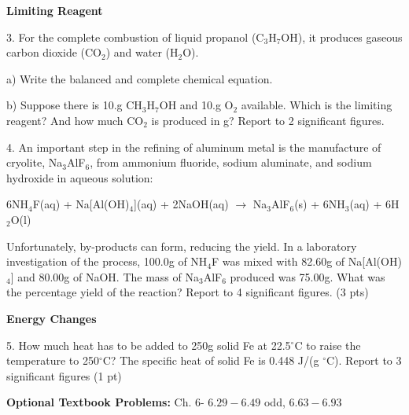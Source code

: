 \documentclass[12pt]{article}
\begin{document}
\textbf{Limiting Reagent}

3. For the complete combustion of liquid propanol (C$_3$H$_7$OH), it produces gaseous
carbon dioxide (CO$_2$) and water (H$_2$O).

a) Write the balanced and complete chemical equation.

b) Suppose there is 10.g CH$_3$H$_7$OH and 10.g O$_2$ available. Which is the limiting
reagent? And how much CO$_2$ is produced in g? Report to 2 significant figures.

\newpage

4. An important step in the refining of aluminum metal is the manufacture of cryolite,
Na$_3$AlF$_6$, from ammonium fluoride, sodium aluminate, and sodium hydroxide in aqueous
solution:

6NH$_4$F(aq) + Na[Al(OH)$_4$](aq) + 2NaOH(aq) $\rightarrow$ Na$_3$AlF$_6$(s) + 6NH$_3$(aq)
+ 6H$_2$O(l)

Unfortunately, by-products can form, reducing the yield. In a laboratory investigation of
the process, 100.0g of NH$_4$F was mixed with 82.60g of Na[Al(OH)$_4$] and 80.00g of NaOH.
The mass of Na$_3$AlF$_6$ produced was 75.00g. What was the percentage yield of the reaction?
Report to 4 significant figures. (3 pts)

\vspace{3in}

\textbf{Energy Changes}

5. How much heat has to be added to 250g solid Fe at 22.5$^\circ$C to raise the temperature to
250$^\circ$C? The specific heat of solid Fe is 0.448 J/(g $^\circ$C). Report to 3 significant
figures (1 pt)

\vfill

\textbf{Optional Textbook Problems:} Ch. 6- $6.29 - 6.49$ odd, $6.63 - 6.93$
\end{document}
